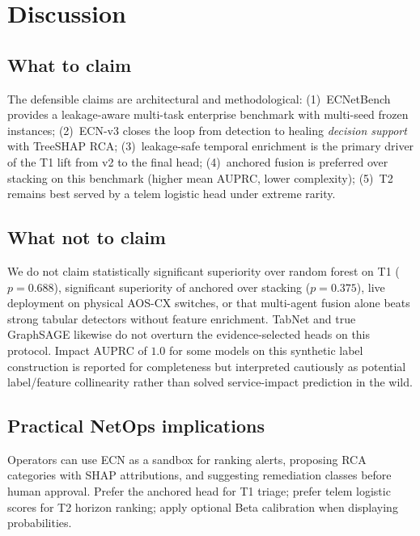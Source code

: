 \section{Discussion}
\label{sec:disc}

\subsection{What to claim}
The defensible claims are architectural and methodological: (1)~ECNetBench provides a leakage-aware multi-task enterprise benchmark with multi-seed frozen instances; (2)~ECN-v3 closes the loop from detection to healing \emph{decision support} with TreeSHAP RCA; (3)~leakage-safe temporal enrichment is the primary driver of the T1 lift from v2 to the final head; (4)~anchored fusion is preferred over stacking on this benchmark (higher mean AUPRC, lower complexity); (5)~T2 remains best served by a telem logistic head under extreme rarity.

\subsection{What not to claim}
We do not claim statistically significant superiority over random forest on T1 ($p{=}0.688$), significant superiority of anchored over stacking ($p{=}0.375$), live deployment on physical AOS-CX switches, or that multi-agent fusion alone beats strong tabular detectors without feature enrichment. TabNet and true GraphSAGE likewise do not overturn the evidence-selected heads on this protocol. Impact AUPRC of $1.0$ for some models on this synthetic label construction is reported for completeness but interpreted cautiously as potential label/feature collinearity rather than solved service-impact prediction in the wild.

\subsection{Practical NetOps implications}
Operators can use ECN as a sandbox for ranking alerts, proposing RCA categories with SHAP attributions, and suggesting remediation classes before human approval. Prefer the anchored head for T1 triage; prefer telem logistic scores for T2 horizon ranking; apply optional Beta calibration when displaying probabilities.

